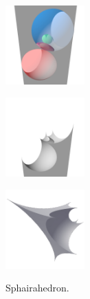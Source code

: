 \documentclass[suppldata, dvipdfmx]{interact}
\theoremstyle{plain}%
\theoremstyle{definition}
\theoremstyle{remark}
\theoremstyle{problemstyle}
\begin{document}
\begin{figure}[h!tbp]
  \begin{minipage}[t]{0.3\textwidth}
   \centering
   \includegraphics[width=1.2in, height=1.2in, keepaspectratio]
   {./img/sphairahedralPrism/sphairaAll.jpg}
   \label{fig:sphairaPrismAll}
  \end{minipage}
  \hspace*{\fill}
  \begin{minipage}[t]{0.3\textwidth}
   \centering
   \includegraphics[width=1.2in, height=1.2in, keepaspectratio]
   {./img/sphairahedralPrism/sphairaHalf.jpg}
   \label{fig:sphairaPrismHalf}
  \end{minipage}
  \hspace*{\fill}
  \begin{minipage}[t]{0.3\textwidth}
   \centering
   \includegraphics[width=1.2in, height=1.2in,
   keepaspectratio]{./img/sphairahedralPrism/sphairahedron.jpg} 
   \label{fig:sphairahedronFinite}
  \end{minipage}
  \hspace*{\fill}
  \caption{Sphairahedron.}
  \label{fig:sphairahedron}
 \end{figure}
\end{document}

